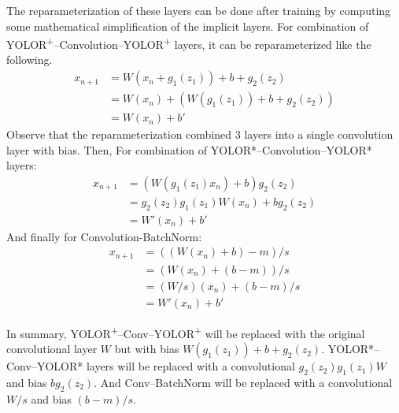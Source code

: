   The reparameterization of these layers can be done after training by computing
  some mathematical simplification of the implicit layers.
  For combination of YOLOR\textsuperscript{+}--Convolution--YOLOR\textsuperscript{+} layers, it can be reparameterized like the following.
  \begin{align*}
    x_{n+1} &= W(x_{n}+g_1(z_1)) + b + g_2(z_2)\\
    &= W(x_{n}) + (W(g_1(z_1)) + b + g_2(z_2))\\
    &= W(x_{n}) + b'
  \end{align*}
  Observe that the reparameterization combined 3 layers into a single convolution layer with bias. Then, For combination of
  YOLOR*--Convolution--YOLOR* layers:
  \begin{align*}
    x_{n+1} &= (W(g_1(z_1)x_n)+b)g_2(z_2)\\
    &= g_2(z_2)g_1(z_1)W(x_n) + b g_2(z_2)\\
    &= W'(x_n) + b'
  \end{align*}
  And finally for Convolution-BatchNorm:
  \begin{align*}
    x_{n+1} &= ((W(x_n)+b)-m)/s\\
    &= (W(x_n) + (b-m))/s\\
    &= (W/s)(x_n) + (b-m)/s\\
    &= W'(x_n) + b'
  \end{align*}

  In summary, YOLOR\textsuperscript{+}--Conv--YOLOR\textsuperscript{+} will be replaced with the original convolutional layer $W$ but with bias $W(g_1(z_1)) + b + g_2(z_2)$.
  YOLOR*--Conv--YOLOR* layers will be replaced with a convolutional $g_2(z_2)g_1(z_1)W$ and bias $b g_2(z_2)$.
  And Conv--BatchNorm will be replaced with a convolutional $W/s$ and bias $(b-m)/s$.
  
  
